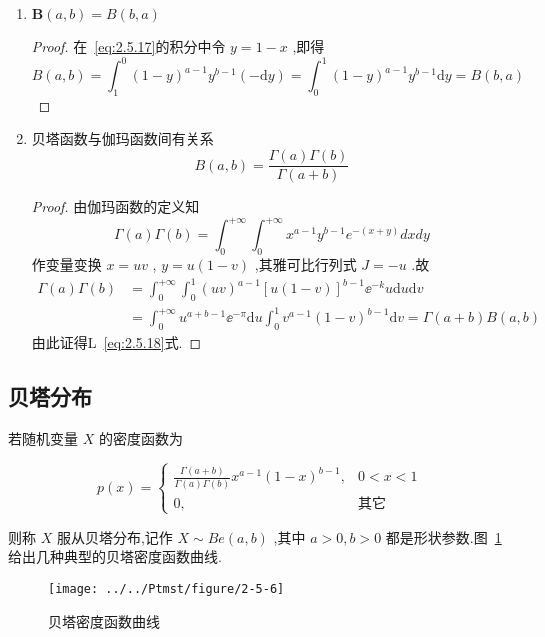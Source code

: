 \begin{enumerate}
	\item $ \mathbf{B}(a, b)=B(b, a) $ 
	\begin{proof}
		在~\ref{eq:2.5.17}的积分中令 $ y=1-x $ ,即得
		\[
		B(a, b)=\int_{1}^{0}(1-y)^{a-1} y^{b-1}(-\mathrm{d} y)=\int_{0}^{1}(1-y)^{a-1} y^{b-1} \mathrm{d} y=B(b, a)
		\]
	\end{proof}
	\item 贝塔函数与伽玛函数间有关系
	\begin{equation}
	B(a, b)=\frac{\Gamma(a) \Gamma(b)}{\Gamma(a+b)} \label{eq:2.5.18}
	\end{equation}
	\begin{proof}
		由伽玛函数的定义知
		\[
		\Gamma(a) \Gamma(b)=\int_{0}^{+\infty} \int_{0}^{+\infty} x^{a-1} y^{b-1} e^{-(x+y)} d x d y
		\]
		作变量变换 $ x=uv $ , $ y=u(1-v) $ ,其雅可比行列式 $ J=-u $ .故
		\[
		\begin{aligned} \Gamma(a) \Gamma(b) &=\int_{0}^{+\infty} \int_{0}^{1}(u v)^{a-1}[u(1-v)]^{b-1} \ee ^{-k} u \mathrm{d} u \mathrm{d} v \\ &=\int_{0}^{+\infty} u^{a+b-1} \ee ^{-\pi} \mathrm{d} u \int_{0}^{1} v^{a-1}(1-v)^{b-1} \mathrm{d} v=\Gamma(a+b) B(a, b) \end{aligned}
		\]
		由此证得L~\ref{eq:2.5.18}式.
	\end{proof}
\end{enumerate}

\subsection{贝塔分布}

若随机变量 $ X $ 的密度函数为

\begin{equation}
p(x)=\left\{\begin{array}{ll}
{\frac{\Gamma(a+b)}{\Gamma(a) \Gamma(b)} x^{a-1}(1-x)^{b-1},} & { 0<x<1}\\ 
{0,} & {\text{其它}}
\end{array}
\right. \label{eq:2.5.19}
\end{equation}

则称 $ X $ 服从贝塔分布,记作 $ X \sim B e(a, b) $ ,其中 $ a>0,b>0 $ 都是形状参数.图~\ref{fig:2-5-6}给出几种典型的贝塔密度函数曲线.

\begin{figure}
	\centering
	\texttt{[image: ../../Ptmst/figure/2-5-6]}
	\caption{贝塔密度函数曲线}
	\label{fig:2-5-6}
\end{figure}

